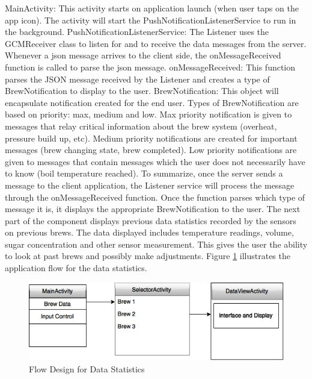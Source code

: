 \documentclass{article}
\begin{document}
MainActivity: This activity starts on application launch (when user taps on the app icon). The activity will start the PushNotificationListenerService to run in the background.
PushNotificationListenerService: The Listener uses the GCMReceiver class to listen for and to receive the data messages from the server. Whenever a \gls{json} message arrives to the client side, the onMessageReceived function is called to parse the \gls{json} message.
onMessageReceived: This function parses the JSON message received by the Listener and creates a type of BrewNotification to display to the user.
BrewNotification: This object will encapsulate notification created for the end user. Types of BrewNotification are based on priority: max, medium and low. Max priority notification is given to messages that relay critical information about the brew system (overheat, pressure build up, etc). Medium priority notifications are created for important messages (brew changing state, brew completed). Low priority notifications are given to messages that contain messages which the user does not necessarily have to know (boil temperature reached).
To summarize, once the server sends a message to the client application,  the Listener service will process the message through the onMessageReceived function. Once the function parses which type of message it is, it displays the appropriate BrewNotification to the user.
The next part of the component displays previous data statistics recorded by the sensors on previous brews. The data displayed includes temperature readings, volume, sugar concentration and other sensor measurement. This gives the user the ability to look at past brews and possibly make adjustments. Figure \ref{fig:data-statistics} illustrates the application flow for the data statistics.

\begin{figure}[H]
\begin{center}
\includegraphics[scale=0.50]{data-statistics.png}
\caption{Flow Design for Data Statistics}
\label{fig:data-statistics}
\end{center}
\end{figure}
\end{document}
